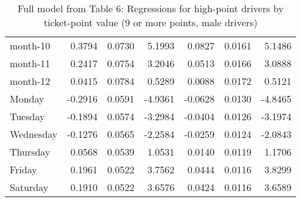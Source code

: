 \documentclass[10pt]{article}
\begin{document}
\begin{table}[ht]
\begin{tabular}{lrrrrrr}
  month-10 & 0.3794 & 0.0730 & 5.1993 & 0.0827 & 0.0161 & 5.1486 \\ 
  month-11 & 0.2417 & 0.0754 & 3.2046 & 0.0513 & 0.0166 & 3.0888 \\ 
  month-12 & 0.0415 & 0.0784 & 0.5289 & 0.0088 & 0.0172 & 0.5121 \\ 
  Monday & -0.2916 & 0.0591 & -4.9361 & -0.0628 & 0.0130 & -4.8465 \\ 
  Tuesday & -0.1894 & 0.0574 & -3.2984 & -0.0404 & 0.0126 & -3.1974 \\ 
  Wednesday & -0.1276 & 0.0565 & -2.2584 & -0.0259 & 0.0124 & -2.0843 \\ 
  Thursday & 0.0568 & 0.0539 & 1.0531 & 0.0140 & 0.0119 & 1.1706 \\ 
  Friday & 0.1961 & 0.0522 & 3.7562 & 0.0444 & 0.0116 & 3.8299 \\ 
  Saturday & 0.1910 & 0.0522 & 3.6576 & 0.0424 & 0.0116 & 3.6589 \\ 
   \hline
\end{tabular}
\caption{Full model from Table 6: Regressions for high-point drivers by ticket-point value (9 or more points, male drivers)} 
\label{tab_6_9plus_pts_no_age_M}
\end{table}


\clearpage
\pagebreak



\end{document}
